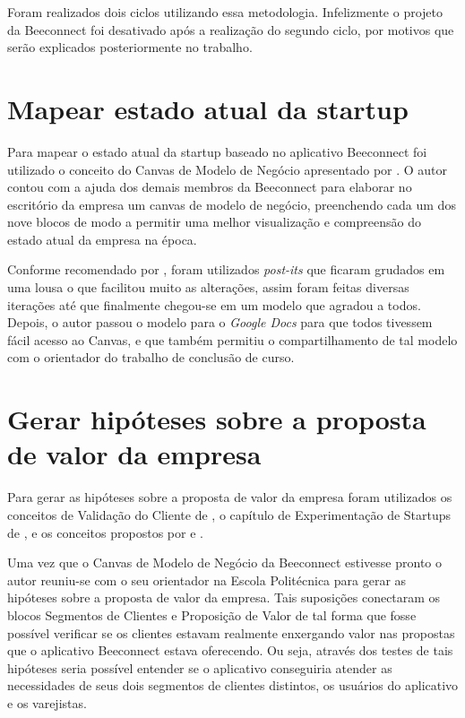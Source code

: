 Foram realizados dois ciclos utilizando essa metodologia. Infelizmente o projeto da Beeconnect foi desativado após a realização do segundo ciclo, por motivos que serão explicados posteriormente no trabalho.

\section{Mapear estado atual da startup}
\label{cha:mapear_estado}
Para mapear o estado atual da startup baseado no aplicativo Beeconnect foi utilizado o conceito do Canvas de Modelo de Negócio apresentado por .
O autor contou com a ajuda dos demais membros da Beeconnect para elaborar no escritório da empresa um canvas de modelo de negócio, preenchendo cada um dos nove blocos de modo a permitir uma melhor visualização e compreensão do estado atual da empresa na época. 

Conforme recomendado por  , foram utilizados \textit{post-its} que ficaram grudados em uma lousa o que facilitou muito as alterações, assim foram feitas diversas iterações até que finalmente chegou-se em um modelo que agradou a todos. Depois, o autor passou o modelo para o \textit{Google Docs} para que todos tivessem fácil acesso ao Canvas, e que também permitiu o compartilhamento de tal modelo com o orientador do trabalho de conclusão de curso.

\section{Gerar hipóteses sobre a proposta de valor da empresa}
\label{cha:gerar_hipoteses}
Para gerar as hipóteses sobre a proposta de valor da empresa foram utilizados os conceitos de Validação do Cliente de , o capítulo de Experimentação de Startups de , e os conceitos propostos por  e .    

Uma vez que o Canvas de Modelo de Negócio da Beeconnect estivesse pronto o autor reuniu-se com o seu orientador na Escola Politécnica para gerar as hipóteses sobre a proposta de valor da empresa. Tais suposições conectaram os blocos Segmentos de Clientes e Proposição de Valor de tal forma que fosse possível verificar se os clientes estavam realmente enxergando valor nas propostas que o aplicativo Beeconnect estava oferecendo. Ou seja, através dos testes de tais hipóteses seria possível entender se o aplicativo conseguiria atender as necessidades de seus dois segmentos de clientes distintos, os usuários do aplicativo e os varejistas.

